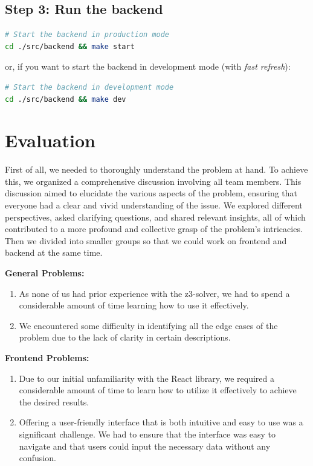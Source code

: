 \documentclass[a4paper, 11pt]{article}
\begin{document}
\subsection{Step 3: Run the backend}

\begin{lstlisting}[language=bash]
# Start the backend in production mode
cd ./src/backend && make start
\end{lstlisting}

or, if you want to start the backend in development mode (with \textit{fast refresh}):

\begin{lstlisting}[language=bash]
# Start the backend in development mode
cd ./src/backend && make dev
\end{lstlisting}

\pagebreak

\section{Evaluation}

First of all, we needed to thoroughly understand the problem at hand. To achieve this, we organized a comprehensive discussion involving all team members. This discussion aimed to elucidate the various aspects of the problem, ensuring that everyone had a clear and vivid understanding of the issue. We explored different perspectives, asked clarifying questions, and shared relevant insights, all of which contributed to a more profound and collective grasp of the problem's intricacies. Then we divided into smaller groups so that we could work on frontend and backend at the same time.

\vspace{1em}

\textbf{General Problems:}

\begin{enumerate}
	\item As none of us had prior experience with the z3-solver, we had to spend a considerable amount of time learning how to use it effectively.
	\item We encountered some difficulty in identifying all the edge cases of the problem due to the lack of clarity in certain descriptions.
\end{enumerate}

\textbf{Frontend Problems:}

\begin{enumerate}
	\item Due to our initial unfamiliarity with the React library, we required a considerable amount of time to learn how to utilize it effectively to achieve the desired results.
	\item Offering a user-friendly interface that is both intuitive and easy to use was a significant challenge. We had to ensure that the interface was easy to navigate and that users could input the necessary data without any confusion.
\end{enumerate}
\end{document}
